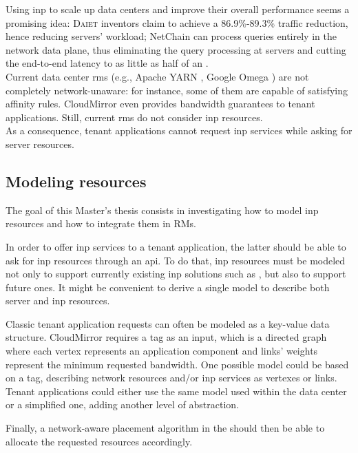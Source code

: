 Using \gls{inp} to scale up data centers and improve their overall performance seems a promising idea: \textsc{Daiet} \cite{daiet} inventors claim to achieve a 86.9\%-89.3\% traffic reduction, hence reducing servers' workload; NetChain \cite{netchain} can process queries entirely in the network data plane, thus eliminating the query processing at servers and cutting the end-to-end latency to as little as half of an .\\
Current data center \glspl{rm} (e.g., Apache YARN \cite{yarn}, Google Omega \cite{omega}) are not completely network-unaware: for instance, some of them are capable of satisfying affinity rules. CloudMirror \cite{cloudmirror} even provides bandwidth guarantees to tenant applications. Still, current \glspl{rm} do not consider \gls{inp} resources.\\
As a consequence, tenant applications cannot request \gls{inp} services while asking for server resources.

\subsection{Modeling \texorpdfstring{}{INP} resources}
The goal of this Master's thesis consists in investigating how to model \gls{inp} resources and how to integrate them in RMs.\par
In order to offer \gls{inp} services to a tenant application, the latter should be able to ask for \gls{inp} resources through an \gls{api}. To do that, \gls{inp} resources must be modeled not only to support currently existing \gls{inp} solutions such as \cite{daiet} \cite{netchain} \cite{incbricks} \cite{sharp}, but also to support future ones. It might be convenient to derive a single model to describe both server and \gls{inp} resources.\par
Classic tenant application requests can often be modeled as a key-value data structure. CloudMirror \cite{cloudmirror} requires a \gls{tag} as an input, which is a directed graph where each vertex represents an application component and links' weights represent the minimum requested bandwidth. One possible model could be based on a \gls{tag}, describing network resources and/or \gls{inp} services as vertexes or links. Tenant applications could either use the same model used within the data center or a simplified one, adding another level of abstraction.\par
{}
Finally, a network-aware placement algorithm in the  should then be able to allocate the requested resources accordingly.